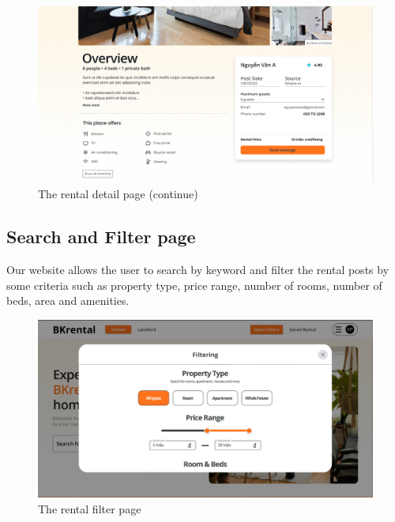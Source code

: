 \begin{figure}[ht]
    \centering
    \includegraphics[width=\textwidth]{Images/Mockup/rental_detail_2.png}
    \caption{The rental detail page (continue)}
    \label{fig:rental-detail-page-2}
\end{figure}
\clearpage

\subsection{Search and Filter page}
Our website allows the user to search by keyword and filter the rental posts by some criteria such as property type, price range, number of rooms, number of beds, area and amenities. 

\begin{figure}[ht]
    \centering
    \includegraphics[width=\textwidth]{Images/Mockup/rental_filter_1.png}
    \caption{The rental filter page}
    \label{fig:rental-filter-1} 
\end{figure}

